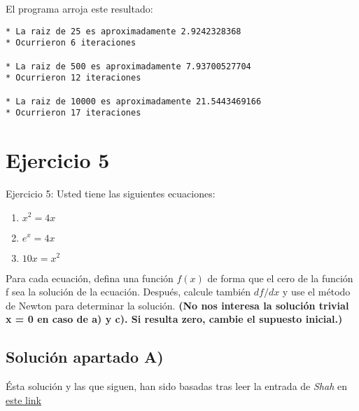 \documentclass[11pt]{article}
\begin{document}
    El programa arroja este resultado:

\begin{verbatim}
* La raiz de 25 es aproximadamente 2.9242328368
* Ocurrieron 6 iteraciones 

* La raiz de 500 es aproximadamente 7.93700527704
* Ocurrieron 12 iteraciones 

* La raiz de 10000 es aproximadamente 21.5443469166
* Ocurrieron 17 iteraciones 
\end{verbatim}

    \section{Ejercicio 5}\label{ejercicio-5}

    Ejercicio 5: Usted tiene las siguientes ecuaciones:

\begin{enumerate}
\def\labelenumi{\alph{enumi})}
\item
  \(x^2 = 4x\)
\item
  \(e^x = 4x\)
\item
  \(10x = x^2\)
\end{enumerate}

Para cada ecuación, defina una función \(f(x)\) de forma que el cero de
la función f sea la solución de la ecuación. Después, calcule también
\(df/dx\) y use el método de Newton para determinar la solución.
\textbf{(No nos interesa la solución trivial x = 0 en caso de a) y c).
Si resulta zero, cambie el supuesto inicial.)}

    \subsection{Solución apartado A)}\label{soluciuxf3n-apartado-a}

    Ésta solución y las que siguen, han sido basadas tras leer la entrada de
\emph{Shah} en
\href{https://pythonfornumericalmethods.wordpress.com/2015/10/17/metodo-de-newton/}{este
link}
\end{document}
